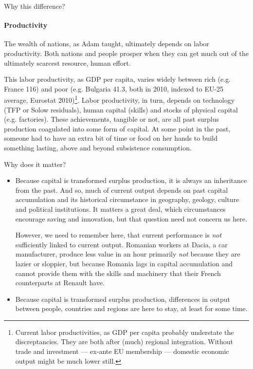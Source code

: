 \documentclass[11pt,a4paper,oneside,openright]{article}
\begin{document}
Why this difference?

\paragraph{Productivity} The wealth of nations, as Adam \cite{Smith-1776-lq} taught, ultimately depends on labor productivity. Both nations and people prosper when they can get much out of the ultimately scarcest resource, human effort. 

This labor productivity, as \gls{GDP} per capita, varies widely between rich (e.g. France 116) and poor (e.g. Bulgaria 41.3, both in 2010, indexed to EU-25 average, Eurostat 2010)\footnote{
	Current labor productivities, as \gls{GDP} per capita probably understate the discreptancies. They are both after (much) regional integration. Without trade and investment --- ex-ante EU membership --- domestic economic output might be much lower still.}. 
Labor productivity, in turn, depends on technology (\gls{TFP} or Solow residuals), human capital (skills) and stocks of physical capital (e.g. factories). These achievements, tangible or not, are all past surplus production coagulated into some form of capital. At some point in the past, someone had to have an extra bit of time or food on her hands to build something lasting, above and beyond subsistence consumption.

Why does it matter?

\begin{itemize}
	\item Because capital is transformed surplus production, it is always an inheritance from the past. And so, much of current output depends on past capital accumulation and its historical circumstance in geography, geology, culture and political institutions. It matters a great deal, which circumstances encourage saving and innovation, but that question need not concern us here. %

	However, we need to remember here, that current performance is \emph{not} sufficiently linked to current output. Romanian workers at Dacia, a car manufacturer, produce less value in an hour primarily \emph{not} because they are lazier or sloppier, but because Romania lags in capital accumulation and cannot provide them with the skills and machinery that their French counterparts at Renault have. 

	\item Because capital is transformed surplus production, differences in output between people, countries and regions are here to stay, at least for some time.
\end{itemize}
\end{document}
